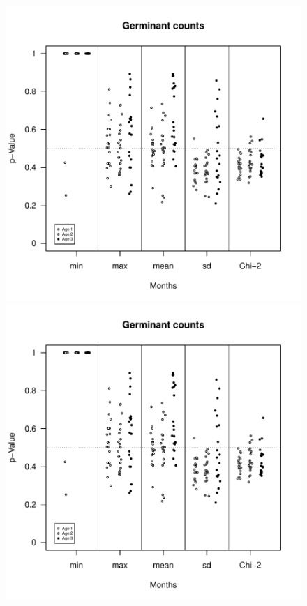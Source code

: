 \documentclass[12pt, oneside, titlepage]{article}   	%
\begin{document}
\begin{figure}[!h]
   \centering
       \includegraphics[page=1,scale=.5]{../../figures/modelChecks/germination-ppc.pdf}  
       \includegraphics[page=2,scale=.5]{../../figures/modelChecks/germination-ppc.pdf}  
 \label{fig:name}
\end{figure}
\end{document}
